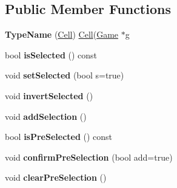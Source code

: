 \subsection*{\-Public \-Member \-Functions}
\begin{DoxyCompactItemize}
\item 
\hypertarget{class_cell_a822cb9d9d4df2c9095e45a161ea13aed}{{\bfseries \-Type\-Name} (\hyperlink{class_cell}{\-Cell}) \hyperlink{class_cell}{\-Cell}(\hyperlink{class_game}{\-Game} $\ast$g}\label{class_cell_a822cb9d9d4df2c9095e45a161ea13aed}

\item 
\hypertarget{class_cell_a394830e18401f3b414c3dde4a2b4e2e8}{bool {\bfseries is\-Selected} () const }\label{class_cell_a394830e18401f3b414c3dde4a2b4e2e8}

\item 
\hypertarget{class_cell_a40146bbb2b74cf56337462abc4d0327c}{void {\bfseries set\-Selected} (bool s=true)}\label{class_cell_a40146bbb2b74cf56337462abc4d0327c}

\item 
\hypertarget{class_cell_ad8310bd5ddbdcb3ab3036356556b32b3}{void {\bfseries invert\-Selected} ()}\label{class_cell_ad8310bd5ddbdcb3ab3036356556b32b3}

\item 
\hypertarget{class_cell_a9801c2d435d44834bd14a80fba778618}{void {\bfseries add\-Selection} ()}\label{class_cell_a9801c2d435d44834bd14a80fba778618}

\item 
\hypertarget{class_cell_aa7456089022c5d2dabd4325d03007759}{bool {\bfseries is\-Pre\-Selected} () const }\label{class_cell_aa7456089022c5d2dabd4325d03007759}

\item 
\hypertarget{class_cell_a16f6d41be75c42ad20ad29d0b5725ece}{void {\bfseries confirm\-Pre\-Selection} (bool add=true)}\label{class_cell_a16f6d41be75c42ad20ad29d0b5725ece}

\item 
\hypertarget{class_cell_aa0704872b8d4ae7f40022cfebfa48944}{void {\bfseries clear\-Pre\-Selection} ()}\label{class_cell_aa0704872b8d4ae7f40022cfebfa48944}

\end{DoxyCompactItemize}
